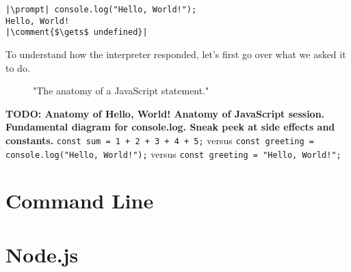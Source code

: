 \reactivatelinenumbers
\begin{lstlisting}[caption={\label{listing:intro-console} A session in the JavaScript console of a web browser.}, escapeinside=||]
|\prompt| console.log("Hello, World!");
Hello, World!
|\comment{$\gets$ undefined}|
\end{lstlisting}

To understand how the interpreter responded, let's first go over what we asked it to do.

\begin{figure}[h]
  
  \caption{"The anatomy of a JavaScript statement."}
\end{figure}

\textbf{TODO: Anatomy of Hello, World! Anatomy of JavaScript session. Fundamental diagram for console.log. Sneak peek at side effects and constants.} \texttt{const sum = 1 + 2 + 3 + 4 + 5;} versus \texttt{const greeting = console.log("Hello, World!");} versus \texttt{const greeting = "Hello, World!";}


\section{Command Line}

\section{Node.js}
